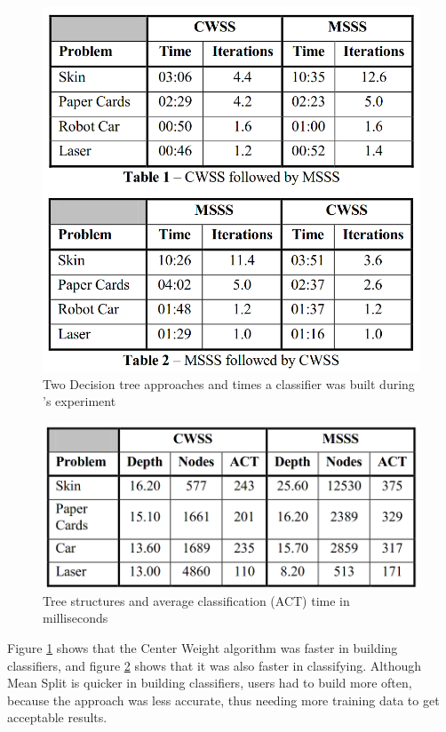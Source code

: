 \documentclass[sigchi]{acmart}
\begin{document}
\begin{figure}
    \centering
    \includegraphics{cwss-vs-msss}
    \caption{Two Decision tree approaches and times a classifier was built during \citeauthor{imlheur2018}'s experiment}
    \label{fig:cwss-vs-msss}
\end{figure}

\begin{figure}
    \centering
    \includegraphics{act}
    \caption{Tree structures and average classification (ACT) time in milliseconds~\cite{imlheur2018}}
    \label{fig:act}
\end{figure}

Figure \ref{fig:cwss-vs-msss} shows that the Center Weight algorithm was faster in building classifiers, and figure \ref{fig:act} shows that it was also faster in classifying. Although Mean Split is quicker in building classifiers, users had to build more often, because the approach was less accurate, thus needing more training data to get acceptable results.
\end{document}
